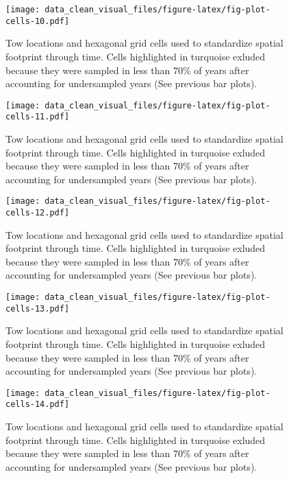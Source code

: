 \documentclass[
]{article}
\begin{document}
\begin{figure}
\centering
\texttt{[image: data\_clean\_visual\_files/figure-latex/fig-plot-cells-10.pdf]}
\caption{\label{fig:fig-plot-cells-10}Tow locations and hexagonal grid cells used to standardize spatial footprint through time. Cells highlighted in turquoise exluded because they were sampled in less than 70\% of years after accounting for undersampled years (See previous bar plots).}
\end{figure}

\begin{figure}
\centering
\texttt{[image: data\_clean\_visual\_files/figure-latex/fig-plot-cells-11.pdf]}
\caption{\label{fig:fig-plot-cells-11}Tow locations and hexagonal grid cells used to standardize spatial footprint through time. Cells highlighted in turquoise exluded because they were sampled in less than 70\% of years after accounting for undersampled years (See previous bar plots).}
\end{figure}

\begin{figure}
\centering
\texttt{[image: data\_clean\_visual\_files/figure-latex/fig-plot-cells-12.pdf]}
\caption{\label{fig:fig-plot-cells-12}Tow locations and hexagonal grid cells used to standardize spatial footprint through time. Cells highlighted in turquoise exluded because they were sampled in less than 70\% of years after accounting for undersampled years (See previous bar plots).}
\end{figure}

\begin{figure}
\centering
\texttt{[image: data\_clean\_visual\_files/figure-latex/fig-plot-cells-13.pdf]}
\caption{\label{fig:fig-plot-cells-13}Tow locations and hexagonal grid cells used to standardize spatial footprint through time. Cells highlighted in turquoise exluded because they were sampled in less than 70\% of years after accounting for undersampled years (See previous bar plots).}
\end{figure}

\begin{figure}
\centering
\texttt{[image: data\_clean\_visual\_files/figure-latex/fig-plot-cells-14.pdf]}
\caption{\label{fig:fig-plot-cells-14}Tow locations and hexagonal grid cells used to standardize spatial footprint through time. Cells highlighted in turquoise exluded because they were sampled in less than 70\% of years after accounting for undersampled years (See previous bar plots).}
\end{figure}
\end{document}
